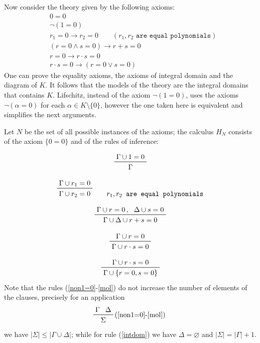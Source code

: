 \documentclass[a4paper,12pt,oneside]{book}
\let\emptyset\varnothing
\let\o\vee
\let\e\wedge
\begin{document}
\noindent Now consider the theory given by the following axioms:
\begin{eqnarray}
& 0=0  \label{ax00} \\
& \neg (1 =0) \\
& r_1=0 \rightarrow r_2 =0 \qquad (r_1,r_2 \texttt{ are equal polynomials}) \\
& ( r=0 \e s=0) \rightarrow r+s=0 \\
& r=0 \rightarrow r\cdot s=0 \\
& r\cdot s=0 \rightarrow (r=0 \o s=0) \label{axintdom}
\end{eqnarray}
One can prove the equality axioms, the axioms of integral domain and the diagram of $K$. It follows that the models of the theory are the integral domains that contains $K$. Lifschitz, instead of the axiom $\neg (1=0)$, uses the axioms  $\neg (\alpha =0)$ for each $\alpha\in K\setminus \{0\}$, however the one taken here is equivalent and simplifies the next arguments.  

Let $N$ be the set of all possible instances of the axioms; the calculus $H_N$ consists of the axiom $\{0=0\}$ and of the rules of inference:

\begin{equation}\label{non1=0}
\prftree{\Gamma \cup 1=0}{\Gamma}
\end{equation}

\begin{equation}\label{eqpoly}
\prftree{\Gamma \cup r_1=0 } { \Gamma \cup r_2=0 } \qquad r_1,r_2\texttt{ are equal polynomials}
\end{equation}

\begin{equation}\label{somm}
\prftree{\Gamma \cup r=0 \, ,}{\Delta \cup s=0}{\Gamma \cup \Delta \cup r+s=0 } 
\end{equation}

\begin{equation} \label{mol}
\prftree{\Gamma \cup r=0}{\Gamma \cup r\cdot s=0 } 
\end{equation}

\begin{equation} \label{intdom}
\prftree{\Gamma \cup r\cdot s=0}{\Gamma \cup  \{r=0,s=0\} } 
\end{equation}
Note that the rules (\ref{non1=0}-\ref{mol}) do not increase the number of elements of the clauses, precisely for an application 
$$
\prftree[r]{(\ref{non1=0}-\ref{mol}) } {\Gamma}{\Delta}{\hspace{2mm}\Sigma\hspace{2mm}}
$$
we have $ |\Sigma| \leq   |\Gamma\cup\Delta|$; while for rule (\ref{intdom})
we have $\Delta = \emptyset$ and  $ |\Sigma| =   |\Gamma| +1 $. \\
\end{document}
